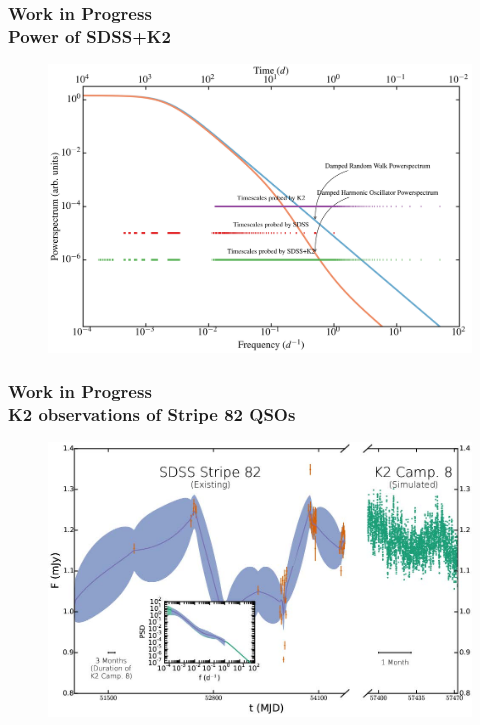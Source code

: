\documentclass[hyperref={pdfpagelabels=false}]{beamer}
\begin{document}
\begin{frame}
\frametitle{Work in Progress\\Power of SDSS+K2}
        \begin{figure}
          \includegraphics[scale=0.05]{images/PowerOfSDSSK2.jpg}
        \end{figure}
\end{frame}

\begin{frame}
\frametitle{Work in Progress\\K2 observations of Stripe 82 QSOs}
        \begin{figure}
          \includegraphics[scale=0.20]{images/LC_2.jpg}
        \end{figure}
\end{frame}
\end{document}
